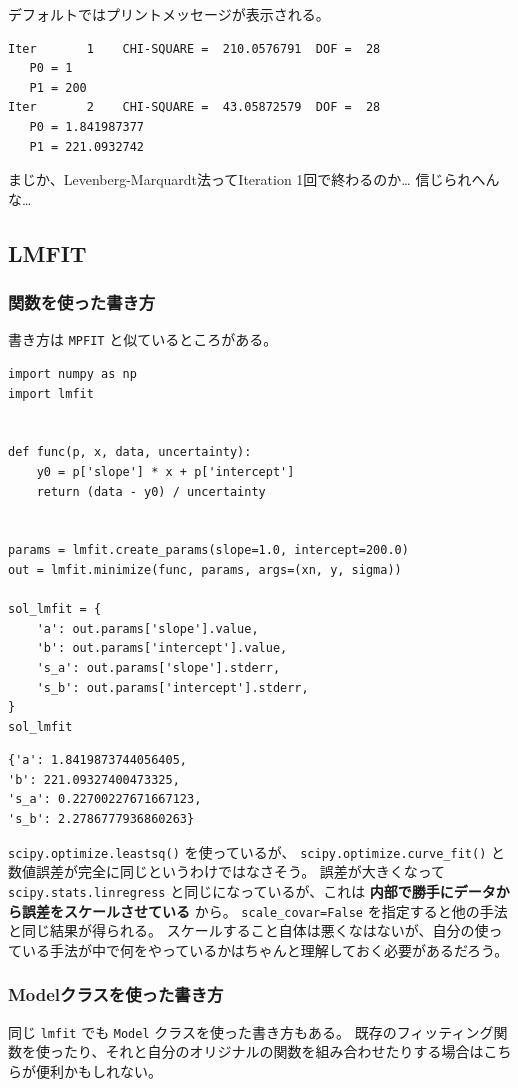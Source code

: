 \documentclass[a4paper, 9pt, notitlepage, uplatex, dvipdfmx]{jsarticle}
\begin{document}
デフォルトではプリントメッセージが表示される。
\begin{verbatim}
Iter       1    CHI-SQUARE =  210.0576791  DOF =  28
   P0 = 1  
   P1 = 200  
Iter       2    CHI-SQUARE =  43.05872579  DOF =  28
   P0 = 1.841987377  
   P1 = 221.0932742  
\end{verbatim}
まじか、Levenberg-Marquardt法ってIteration 1回で終わるのか\ldots{} 信じられへんな\ldots{}
\subsection{LMFIT}
\label{sec:orgc85e022}
\subsubsection{関数を使った書き方}
\label{sec:orga1778cf}
書き方は \texttt{MPFIT} と似ているところがある。

\begin{verbatim}
import numpy as np
import lmfit


def func(p, x, data, uncertainty):
    y0 = p['slope'] * x + p['intercept']
    return (data - y0) / uncertainty


params = lmfit.create_params(slope=1.0, intercept=200.0)
out = lmfit.minimize(func, params, args=(xn, y, sigma))

sol_lmfit = {
    'a': out.params['slope'].value,
    'b': out.params['intercept'].value,
    's_a': out.params['slope'].stderr,
    's_b': out.params['intercept'].stderr,
}
sol_lmfit
\end{verbatim}

\label{}
\begin{verbatim}
{'a': 1.8419873744056405,
'b': 221.09327400473325,
's_a': 0.22700227671667123,
's_b': 2.2786777936860263}
\end{verbatim}

\texttt{scipy.optimize.leastsq()} を使っているが、 \texttt{scipy.optimize.curve\_fit()} と数値誤差が完全に同じというわけではなさそう。
誤差が大きくなって \texttt{scipy.stats.linregress} と同じになっているが、これは \textbf{内部で勝手にデータから誤差をスケールさせている} から。
\texttt{scale\_covar=False} を指定すると他の手法と同じ結果が得られる。
スケールすること自体は悪くなはないが、自分の使っている手法が中で何をやっているかはちゃんと理解しておく必要があるだろう。
\subsubsection{Modelクラスを使った書き方}
\label{sec:orge43cfc5}
同じ \texttt{lmfit} でも \texttt{Model} クラスを使った書き方もある。
既存のフィッティング関数を使ったり、それと自分のオリジナルの関数を組み合わせたりする場合はこちらが便利かもしれない。
\end{document}
